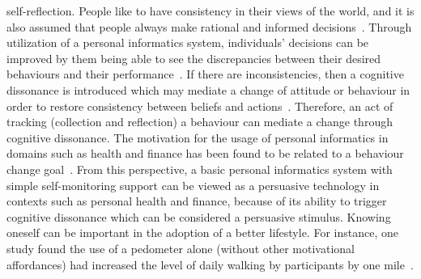 self-reflection. People like to have consistency in their views of the world, and it is also assumed that people always make rational and informed decisions~\citep{Oinas-kukkonen:psd}. Through utilization of a personal informatics system, individuals' decisions can be improved by them being able to see the discrepancies between their desired behaviours and their performance~\citep{comber2013designing}. If there are inconsistencies, then a cognitive dissonance is introduced which may mediate a change of attitude or behaviour in order to restore consistency between beliefs and actions~\citep{Oinas-kukkonen:psd}. Therefore, an act of tracking (collection and reflection) a behaviour can mediate a change through cognitive dissonance. The motivation for the usage of personal informatics in domains such as health and finance has been found to be related to a behaviour change goal~\citep{epstein2015lived}. From this perspective, a basic personal informatics system with simple self-monitoring support can be viewed as a persuasive technology in contexts such as personal health and finance, because of its ability to trigger cognitive dissonance which can be considered a persuasive stimulus. Knowing oneself can be important in the adoption of a better lifestyle. For instance, one study found the use of a pedometer alone (without other motivational affordances) had increased the level of daily walking by participants by one mile~\citep{bravata2007using}.  

